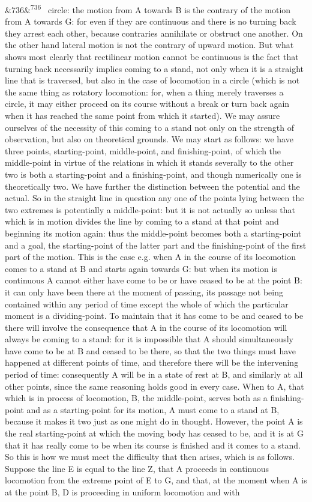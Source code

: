 \documentclass[12pt]{article}
\newcommand{\para}[1][]{\par\noindent\ifx&#1&\else\textsuperscript{\footnotesize #1}~\fi}
\begin{document}
\para[736] circle: the motion from A towards B is the contrary of the motion from A towards G: for even if they are continuous and there is no turning back they arrest each other, because contraries annihilate or obstruct one another. On the other hand lateral motion is not the contrary of upward motion. But what shows most clearly that rectilinear motion cannot be continuous is the fact that turning back necessarily implies coming to a stand, not only when it is a straight line that is traversed, but also in the case of locomotion in a circle (which is not the same thing as rotatory locomotion: for, when a thing merely traverses a circle, it may either proceed on its course without a break or turn back again when it has reached the same point from which it started). We may assure ourselves of the necessity of this coming to a stand not only on the strength of observation, but also on theoretical grounds. We may start as follows: we have three points, starting-point, middle-point, and finishing-point, of which the middle-point in virtue of the relations in which it stands severally to the other two is both a starting-point and a finishing-point, and though numerically one is theoretically two. We have further the distinction between the potential and the actual. So in the straight line in question any one of the points lying between the two extremes is potentially a middle-point: but it is not actually so unless that which is in motion divides the line by coming to a stand at that point and beginning its motion again: thus the middle-point becomes both a starting-point and a goal, the starting-point of the latter part and the finishing-point of the first part of the motion. This is the case e.g. when A in the course of its locomotion comes to a stand at B and starts again towards G: but when its motion is continuous A cannot either have come to be or have ceased to be at the point B: it can only have been there at the moment of passing, its passage not being contained within any period of time except the whole of which the particular moment is a dividing-point. To maintain that it has come to be and ceased to be there will involve the consequence that A in the course of its locomotion will always be coming to a stand: for it is impossible that A should simultaneously have come to be at B and ceased to be there, so that the two things must have happened at different points of time, and therefore there will be the intervening period of time: consequently A will be in a state of rest at B, and similarly at all other points, since the same reasoning holds good in every case. When to A, that which is in process of locomotion, B, the middle-point, serves both as a finishing-point and as a starting-point for its motion, A must come to a stand at B, because it makes it two just as one might do in thought. However, the point A is the real starting-point at which the moving body has ceased to be, and it is at G that it has really come to be when its course is finished and it comes to a stand. So this is how we must meet the difficulty that then arises, which is as follows. Suppose the line E is equal to the line Z, that A proceeds in continuous locomotion from the extreme point of E to G, and that, at the moment when A is at the point B, D is proceeding in uniform locomotion and with 
\end{document}
